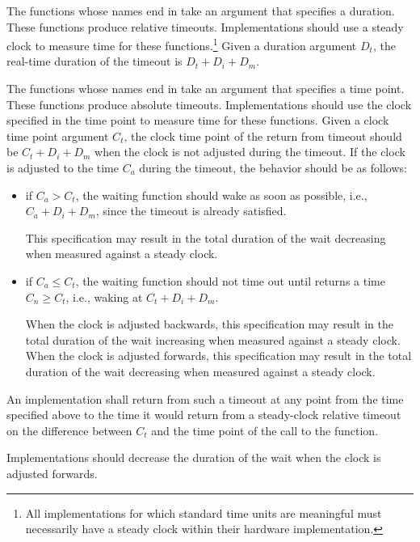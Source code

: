 \pnum
The functions whose names end in  take an argument that
specifies a duration. These functions produce relative timeouts. Implementations
should use a steady clock to measure time for these functions.\footnote{All
implementations for which standard time units are meaningful must necessarily
have a steady clock within their hardware implementation.} Given a duration
argument $D_t$, the real-time duration of the timeout is $D_t + D_i + D_m$.

\pnum
The functions whose names end in  take an argument that specifies a time
point. These functions produce absolute timeouts. Implementations should use the clock
specified in the time point to measure time for these functions. Given a clock time point
argument $C_t$, the clock time point of the return from timeout should be $C_t + D_i + D_m$
when the clock is not adjusted during the timeout. If the clock is adjusted to the time $C_a$
during the timeout, the behavior should be as follows:

\begin{itemize}
\item
if $C_a > C_t$, the waiting function should wake as soon as possible, i.e., $C_a + D_i + D_m$,
since the timeout is already satisfied. \begin{note} This specification may result in the total
duration of the wait decreasing when measured against a steady clock. \end{note}

\item
if $C_a \leq C_t$, the waiting function should not time out until  returns a
time $C_n \geq C_t$, i.e., waking at $C_t + D_i + D_m$. \begin{note} When the clock is adjusted
backwards, this specification may result in the total duration of the wait increasing when
measured against a steady clock. When the clock is adjusted forwards, this specification may
result in the total duration of the wait decreasing when measured against a steady clock.
\end{note}
\end{itemize}

An implementation shall return from such a timeout at any point from the time specified above to
the time it would return from a steady-clock relative timeout on the difference between $C_t$
and the time point of the call to the  function. \begin{note} Implementations
should decrease the duration of the wait when the clock is adjusted forwards.
\end{note}

